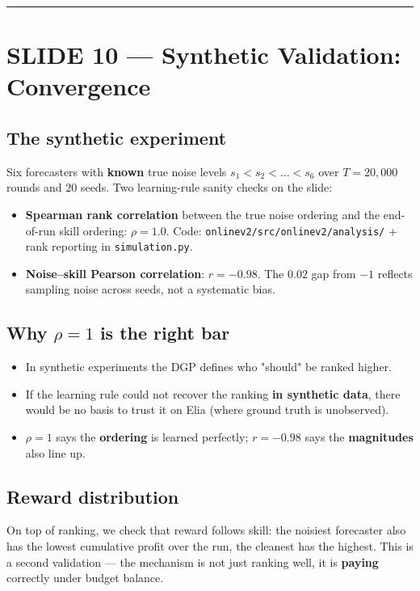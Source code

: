 \documentclass[11pt]{article}
\begin{document}
\bigskip\hrule\bigskip

\section{SLIDE 10 --- Synthetic Validation: Convergence}


\subsection{The synthetic experiment}


Six forecasters with \textbf{known} true noise levels $s_1 < s_2 < \dots < s_6$ over $T=20{,}000$ rounds and $20$ seeds. Two learning-rule sanity checks on the slide:

\begin{itemize}
\item \textbf{Spearman rank correlation} between the true noise ordering and the end-of-run skill ordering: $\rho = 1.0$. Code: \texttt{onlinev2/src/onlinev2/analysis/} + rank reporting in \texttt{simulation.py}.
\item \textbf{Noise--skill Pearson correlation}: $r = -0.98$. The $0.02$ gap from $-1$ reflects sampling noise across seeds, not a systematic bias.
\end{itemize}

\subsection{Why $\rho = 1$ is the right bar}


\begin{itemize}
\item In synthetic experiments the DGP defines who "should" be ranked higher.
\item If the learning rule could not recover the ranking \textbf{in synthetic data}, there would be no basis to trust it on Elia (where ground truth is unobserved).
\item $\rho = 1$ says the \textbf{ordering} is learned perfectly; $r = -0.98$ says the \textbf{magnitudes} also line up.
\end{itemize}

\subsection{Reward distribution}


On top of ranking, we check that reward follows skill: the noisiest forecaster also has the lowest cumulative profit over the run, the cleanest has the highest. This is a second validation --- the mechanism is not just ranking well, it is \textbf{paying} correctly under budget balance.
\end{document}
